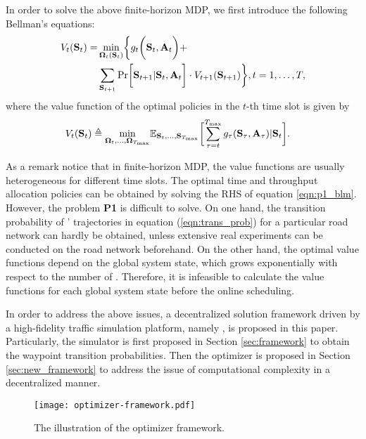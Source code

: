 In order to solve the above finite-horizon MDP, we first introduce the following Bellman's equations:
\begin{align}
    V_{t}(\Stat_t) =& \min_{\Policy_{t}(\Stat_t)} \Brace{ g_{t}\Paren{ \Stat_t, \vec{A}_t } +
    \nonumber\\
    &\sum_{\Stat_{t+1}} \Pr\Bracket{ \Stat_{t+1} | \Stat_{t}, \vec{A}_t } \cdot V_{t+1}(\Stat_{t+1})
    }, t=1,\dots,T,
    \label{eqn:p1_blm}
\end{align}
where the value function of the optimal policies in the $t$-th time slot is given by
\begin{align}
    V_{t}(\Stat_{t}) \define \min_{\Policy_{t},\dots,\Policy_{\T}}& \mathbb{E}_{\Stat_{t},\dots,\Stat_{\T}}
    \Bracket{
        \sum_{\tau=t}^{\T} g_{\tau}\paren{ \Stat_{\tau}, \vec{A}_{\tau} } | \Stat_{t}
    }.
    \label{eqn:p1_val}
\end{align}

As a remark notice that in finite-horizon MDP, the value functions are usually heterogeneous for different time slots. The optimal time and throughput allocation policies can be obtained by solving the RHS of equation \eqref{eqn:p1_blm}.
However, the problem {\bf P1} is difficult to solve.
On one hand, the transition probability of {\IAVs}' trajectories in equation (\ref{eqn:trans_prob}) for a particular road network can hardly be obtained, unless extensive real experiments can be conducted on the road network beforehand.
On the other hand, the optimal value functions depend on the global system state, which grows exponentially with respect to the number of {\IAVs}.
Therefore, it is infeasible to calculate the value functions for each global system state before the online scheduling.

In order to address the above issues, a decentralized solution framework driven by a high-fidelity traffic simulation platform, namely {\fwName}, is proposed in this paper.
Particularly, the {\fwName} simulator is first proposed in Section \ref{sec:framework} to obtain the waypoint transition probabilities.
Then the {\fwName} optimizer is proposed in Section \ref{sec:new_framework} to address the issue of computational complexity in a decentralized manner.

\begin{figure*}[htp!]
    \centering
    \texttt{[image: optimizer-framework.pdf]}
    \caption{The illustration of the {\fwName} optimizer framework.}
    \label{fig:optimizer_framework}
\end{figure*}

